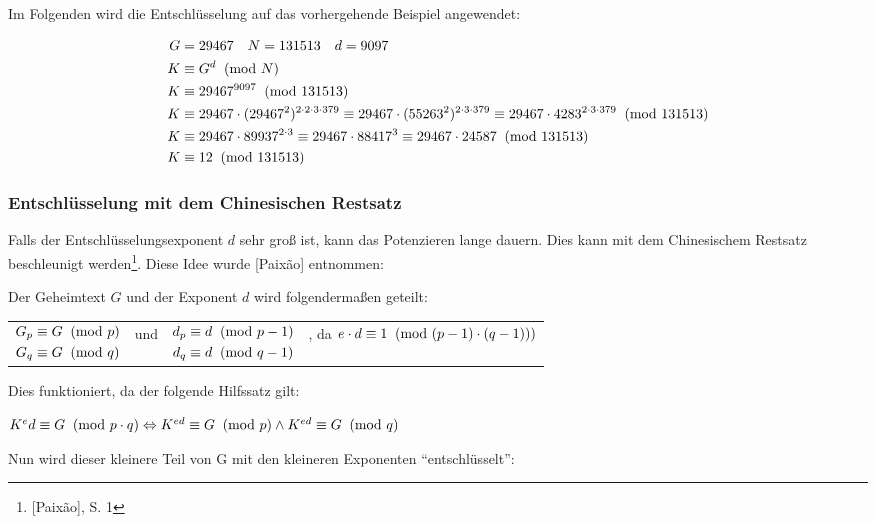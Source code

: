 Im Folgenden wird die Entschlüsselung auf das vorhergehende Beispiel 
angewendet:

\begin{align*}
G &= 29467 ~~~ N= 131513 ~~~ d = 9097 \\
K &\equiv G^d \imod{N}\\
K &\equiv 29467^{9097} \imod{131513}\\
K &\equiv 29467 \cdot (29467^2)^{2 \cdot 2 \cdot 3 \cdot 379} \equiv 29467 \cdot (55263^2)^{2 \cdot 3 \cdot 379} \equiv 29467 \cdot 4283^{2 \cdot 3 \cdot 379} \imod{131513} \\
K &\equiv 29467 \cdot 89937^{2 \cdot 3} \equiv 29467 \cdot 88417^3 \equiv 29467 \cdot 24587 \imod{131513} \\
K &\equiv 12 \imod{131513}
\end{align*}

\subsubsection{Entschlüsselung mit dem Chinesischen Restsatz}
Falls der Entschlüsselungsexponent $d$ sehr groß ist, kann das 
Potenzieren lange dauern. Dies kann mit dem Chinesischem Restsatz 
beschleunigt werden\footnote{[Paixão], S. 1}. 
Diese Idee wurde [Paixão] entnommen:

Der Geheimtext $G$ und der Exponent $d$ wird folgendermaßen geteilt:

\begin{tabular}{llll}
$\begin{aligned}
G_p &\equiv G \imod{p} \\
G_q &\equiv G \imod{q}
\end{aligned}$ & und &
$\begin{aligned}
d_p &\equiv d \imod{p-1} \\
d_q &\equiv d \imod{q-1}
\end{aligned}$ &, da $e \cdot d \equiv 1 \imod{(p-1) \cdot (q-1))}$
\end{tabular}

Dies funktioniert, da der folgende Hilfssatz gilt:

\begin{mdframed}[tikzsetting={draw=red,ultra thick}, innertopmargin=0.6cm]
$K^ed \equiv G \imod{p \cdot q} \Leftrightarrow K^{ed} \equiv G \imod{p} \land K^{ed} \equiv G \imod{q}$
\end{mdframed}

Nun wird dieser kleinere Teil von G mit den kleineren Exponenten "`entschlüsselt"':

